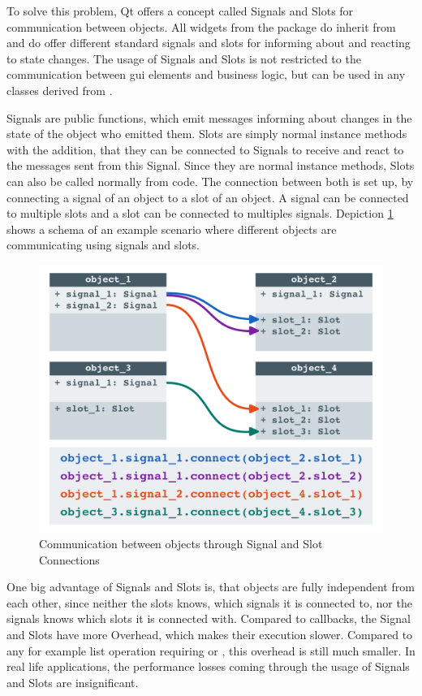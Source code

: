 To solve this problem, Qt offers a concept called Signals and Slots for
communication between objects. All widgets from the package
 do inherit from
 and do offer different standard signals and
slots for informing about and reacting to state changes. The usage of Signals
and Slots is not restricted to the communication between \gls{gui} elements and
business logic, but can be used in any classes derived from
.

Signals are public functions, which emit messages informing about changes in the
state of the object who emitted them. Slots are simply normal instance methods
with the addition, that they can be connected to Signals to receive and react to
the messages sent from this Signal. Since they are normal instance methods,
Slots can also be called normally from code. The connection between both is set
up, by connecting a signal of an object to a slot of an object. A signal can be
connected to multiple slots and a slot can be connected to multiples signals.
Depiction \ref{fig:qt:signalsslots} shows a schema of an example scenario where
different objects are communicating using signals and slots.

\begin{figure}[h]
    \centering
    \includegraphics[width=12cm]{resources/img/QtSignalsSlots}
    \caption{Communication between objects through Signal and Slot Connections}
    \label{fig:qt:signalsslots}
\end{figure}

One big advantage of Signals and Slots is, that objects are fully independent
from each other, since neither the slots knows, which signals it is connected
to, nor the signals knows which slots it is connected with. Compared to
callbacks, the Signal and Slots have more Overhead, which makes their execution
slower. Compared to any for example list operation requiring
 or , this overhead is still much
smaller. In real life applications, the performance losses coming through the
usage of Signals and Slots are insignificant. 
\cite{QtSignalsAndSlots, PythonGui1}

